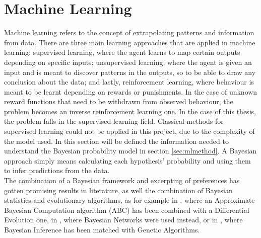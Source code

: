 \section{Machine Learning}\label{sec:ml}
Machine learning refers to the concept of extrapolating patterns and information from data. There are three main learning approaches that are applied in machine learning: supervised learning, where the agent learns to map certain outputs depending on specific inputs; unsupervised learning, where the agent is given an input and is meant to discover patterns in the outputs, so to be able to draw any conclusion about the data; and lastly, reinforcement learning, where behaviour is meant to be learnt depending on rewards or punishments. In the case of unknown reward functions that need to be withdrawn from observed behaviour, the problem becomes an inverse reinforcement learning one. In the case of this thesis, the problem falls in the supervised learning field. Classical methods for supervised learning could not be applied in this project, due to the complexity of the model used.
In this section will be defined the information needed to understand the Bayesian probability model in section \ref{sec:mlmethod}. A Bayesian approach simply means calculating each hypothesis' probability and using them to infer predictions from the data\cite{russell1995modern}.\\ The combination of a Bayesian framework and excerpting of preferences has gotten promising results in literature\cite{rothkopf2011preference}, as well the combination of Bayesian statistics and evolutionary algorithms, as for example in \cite{turner2012375}, where an Approximate Bayesian Computation algorithm (ABC) has been combined with a Differential Evolution one, in \cite{pelikan2003hierarchical}, where Bayesian Networks were used instead, or in \cite{wawrzynczak2014data}, where Bayesian Inference has been matched with Genetic Algorithms. 
